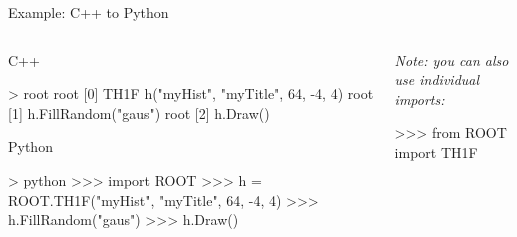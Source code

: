 \documentclass[aspectratio=169]{beamer}
\newcommand{\myfigure}[2]{
    \begin{figure}
        \makebox[\textwidth]{%
            \texttt{[image: \#2]}
        }
    \end{figure}
}
\begin{document}
\begin{frame}[fragile]{Example: C++ to Python}
    \begin{columns}
        \begin{column}{0.65\textwidth}
            \begin{block}{C++}
                \begin{myterminal}
> root
root [0] TH1F h("myHist", "myTitle", 64, -4, 4)
root [1] h.FillRandom("gaus")
root [2] h.Draw()
                \end{myterminal}
            \end{block}
            \begin{block}{Python}
                \begin{myterminal}
> python
>>> import ROOT
>>> h = ROOT.TH1F("myHist", "myTitle", 64, -4, 4)
>>> h.FillRandom("gaus")
>>> h.Draw()
                \end{myterminal}
            \end{block}
        \end{column}
        \begin{column}{0.35\textwidth}
            \myfigure{1.2}{figure-001.pdf}
            \textit{Note: you can also use individual imports:}
            \begin{myterminal}
>>> from ROOT import TH1F
            \end{myterminal}
        \end{column}
    \end{columns}
\end{frame}
\end{document}
